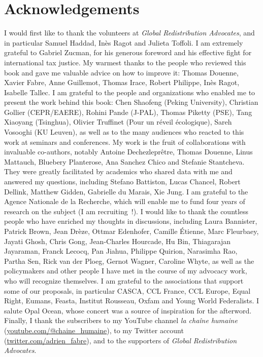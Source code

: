 \documentclass[a5paper,english,openany]{memoir}
\begin{document}
\section*{Acknowledgements}\label{sec:merci} 
I would first like to thank the volunteers at \textit{Global Redistribution Advocates}, and in particular Samuel Haddad, Inès Ragot and Julieta Toffoli. I am extremely grateful to Gabriel Zucman, for his generous foreword and his effective fight for international tax justice. My warmest thanks to the people who reviewed this book and gave me valuable advice on how to improve it: Thomas Douenne, Xavier Fabre, Anne Guillemot, Thomas Irace, Robert Philippe, Inès Ragot, Isabelle Tallec. I am grateful to the people and organizations who enabled me to present the work behind this book: Chen Shaofeng (Peking University), Christian Gollier (CEPR/EAERE), Rohini Pande (J-PAL), Thomas Piketty (PSE), Tang Xiaoyang (Tsinghua), Olivier Truffinet (Pour un réveil écologique), Sareh Vosooghi (KU Leuven), as well as to the many audiences who reacted to this work at seminars and conferences. My work is the fruit of collaborations with invaluable co-authors, notably Antoine Dechezleprêtre, Thomas Douenne, Linus Mattauch, Bluebery Planterose, Ana Sanchez Chico and Stefanie Stantcheva. 
They were greatly facilitated by academics who shared data with me and answered my questions, including Stefano Battiston, Lucas Chancel, Robert Dellink, Matthew Gidden, Gabrielle du Marais, Xie Jung. %
I am grateful to the Agence Nationale de la Recherche, which will enable me to fund four years of research on the subject (I am recruiting~!). 
I would like to thank the countless people who have enriched my thoughts in discussions, including Laura Bannister, Patrick Brown, Jean Drèze, Ottmar Edenhofer, Camille Étienne, Marc Fleurbaey, Jayati Ghosh, Chris Gong, Jean-Charles Hourcade, Hu Bin, Thiagarajan Jayaraman, Franck Lecocq, Pan Jiahua, Philippe Quirion, Narasimha Rao, Partha Sen, Rick van der Ploeg, Gernot Wagner, Caroline Whyte, as well as the policymakers and other people I have met in the course of my advocacy work, who will recognize themselves. I am grateful to the associations that support some of our proposals, 
in particular CASCA, CCL France, CCL Europe, Equal Right, Eumans, Feasta, Institut Rousseau, Oxfam and Young World Federalists. I salute Opal Ocean, whose concert was a source of inspiration for the afterword. Finally, I thank the subscribers to my YouTube channel \textit{la chaîne humaine} (\href{https://www.youtube.com/@chaine_humaine}{youtube.com/@chaine\_humaine}), to my Twitter account (\href{https://twitter.com/adrien_fabre}{twitter.com/adrien\_fabre}), and to the supporters of \textit{Global Redistribution Advocates}.


\pagebreak \vspace*{-2cm}
\listoftables \vspace{-1cm}
\listoffigures
\end{document}

